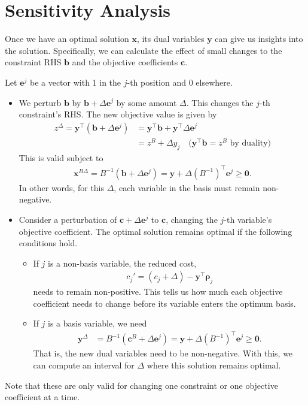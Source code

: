 \documentclass[11pt,a4paper]{article} %
\begin{document}
\newpage
\section{Sensitivity Analysis}
Once we have an optimal solution $\bm x$, its dual variables $\bm y$ can give us insights 
into the solution. Specifically, we can calculate the effect of small 
changes to the constraint RHS $\bm b$ and the objective coefficients $\bm c$.

Let $\bm e^j$ be a vector with 1 in the $j$-th position and 0 elsewhere. 

\begin{itemize}
    \item We perturb $\bm b$ by $\bm b + \Delta \bm e^j$ by some amount $\Delta$.
    This changes the $j$-th constraint's RHS.
    The new objective value is given by 
    \begin{align*}
        z^\Delta = \bm y^\top (\bm b + \Delta \bm e^j) &= \bm y^\top \bm b + \bm y^\top \Delta \bm e^j \\ 
        &= z^B + \Delta y_j \quad \text{($\bm y^\top \bm b = z^B$ by duality)}
    \end{align*}
    This is valid subject to
    \begin{align*}
        \bm x^{B\Delta} = B^{-1}(\bm b + \Delta \bm e^j) = \bm y + \Delta (B^{-1})^\top \bm e^j \ge \bm 0.
    \end{align*}
    In other words, for this $\Delta$, 
    each variable in the basis must remain non-negative.

    \item Consider a perturbation of $\bm c + \Delta \bm e^j$ to $\bm c$, 
    changing the $j$-th variable's objective coefficient. 
    The optimal solution remains optimal if the following conditions hold.
    \begin{itemize}
        \item If $j$ is a non-basis variable, the reduced cost, 
        \begin{align*}
            c_j' = (c_j+\Delta) - \bm y^\top \bm \rho_j
        \end{align*} 
        needs to remain non-positive.
        This tells us how much each objective coefficient needs to change before its 
        variable enters the optimum basis.
        \item If $j$ is a basis variable, we need
        \begin{align*}
            \bm y^\Delta &= B^{-1}(\bm c^B + \Delta \bm e^j) = \bm y+\Delta (B^{-1})^\top \bm e^j \ge \bm 0.
        \end{align*}
        That is, the new dual variables need to be non-negative. 
        With this, we can compute an interval for $\Delta$ 
         where this solution remains optimal.
    \end{itemize}
\end{itemize}
Note that these are only valid for changing one constraint or one objective 
coefficient at a time.
\end{document}
